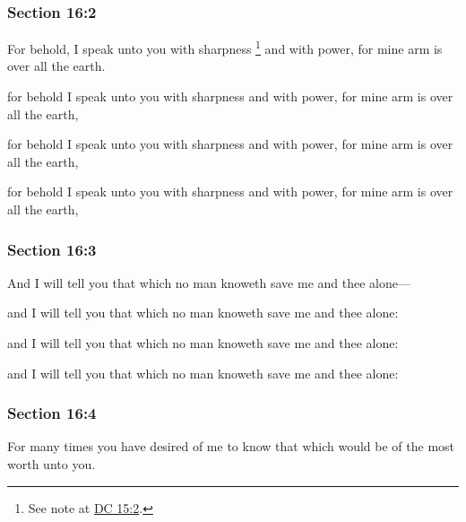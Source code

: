 	\subsubsection{Section 16:2} %
		\label{DC16-2}

		For behold, I speak unto you with sharpness%
			\footnote{%
				See note at \hyperref[DC15-2]{DC 15:2}.
				}
		and with power, for mine arm is over all the earth.

		\begin{framed}
		\scriptsize
			\begin{compactdesc}
				\item[JSP] for behold I speak unto you with sharpness and with power, for mine arm is over all the earth, 
				\item[DC 1835] for behold I speak unto you with sharpness and with power, for mine arm is over all the earth, 
				\item[DC 1844] for behold I speak unto you with sharpness and with power, for mine arm is over all the earth, 
			\end{compactdesc}
		\end{framed}

	\subsubsection{Section 16:3} %
		\label{DC16-3}

		And I will tell you that which no man knoweth save me and thee alone---

		\begin{framed}
		\scriptsize
			\begin{compactdesc}
				\item[JSP] and I will tell you that which no man knoweth save me and thee alone: 
				\item[DC 1835] and I will tell you that which no man knoweth save me and thee alone: 
				\item[DC 1844] and I will tell you that which no man knoweth save me and thee alone: 
			\end{compactdesc}
		\end{framed}

	\subsubsection{Section 16:4} %
		\label{DC16-4}

		For many times you have desired of me to know that which would be of the most worth unto you.

